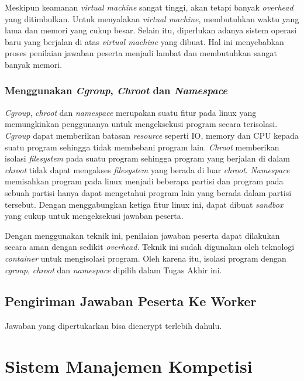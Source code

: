 \par Meskipun keamanan \textit{virtual machine} sangat tinggi, akan tetapi banyak \textit{overhead} yang ditimbulkan. Untuk menyalakan \textit{virtual machine}, membutuhkan waktu yang lama dan memori yang cukup besar. Selain itu, diperlukan adanya sistem operasi baru yang berjalan di atas \textit{virtual machine} yang dibuat. Hal ini menyebabkan proses penilaian jawaban peserta menjadi lambat dan membutuhkan sangat banyak memori.

\subsubsection{Menggunakan \textit{Cgroup}, \textit{Chroot} dan \textit{Namespace}}

\par \textit{Cgroup}, \textit{chroot} dan \textit{namespace} merupakan suatu fitur pada linux yang memungkinkan penggunanya untuk mengeksekusi program secara terisolasi. \textit{Cgroup} dapat memberikan batasan \textit{resource} seperti IO, memory dan CPU kepada suatu program sehingga tidak membebani program lain. \textit{Chroot} memberikan isolasi \textit{filesystem} pada suatu program sehingga program yang berjalan di dalam \textit{chroot} tidak dapat mengakses \textit{filesystem} yang berada di luar \textit{chroot}. \textit{Namespace} memisahkan program pada linux menjadi beberapa partisi dan program pada sebuah partisi hanya dapat mengetahui program lain yang berada dalam partisi tersebut. Dengan menggabungkan ketiga fitur linux ini, dapat dibuat \textit{sandbox} yang cukup untuk mengeksekusi jawaban peserta.

\par Dengan menggunakan teknik ini, penilaian jawaban peserta dapat dilakukan secara aman dengan sedikit \textit{overhead}. Teknik ini sudah digunakan oleh teknologi \textit{container} untuk mengisolasi program. Oleh karena itu, isolasi program dengan \textit{cgroup}, \textit{chroot} dan \textit{namespace} dipilih dalam Tugas Akhir ini.

\subsection{Pengiriman Jawaban Peserta Ke Worker}

\par Jawaban yang dipertukarkan bisa diencrypt terlebih dahulu.

\section{Sistem Manajemen Kompetisi}

